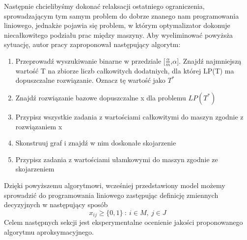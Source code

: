 \documentclass[12pt, a4paper]{report}
\begin{document}
  Następnie chcielibyśmy dokonać relaksacji ostatniego ograniczenia, sprowadzającym tym samym problem do dobrze znanego 
  nam programowania liniowego, jednakże pojawia się problem, w którym optymalizator dokonuje niecałkowitego podziału prac między maszyny. 
  Aby wyeliminować powyżsża sytuację, autor pracy \cite{Alg} zaproponował następujący algorytm:
  \begin{enumerate}
    \item Przeprowadź wyszukiwanie binarne w przedziale [$\frac{\alpha}{m}$,$\alpha$].
    Znajdź najmniejszą wartość T na zbiorze liczb całkowitych dodatniych, dla której 
    LP(T) ma dopuszczalne rozwiązanie. Oznacz tę wartość jako $T^{*}$
    \item Znajdź rozwiązanie bazowe dopuszczalne x dla problemu $LP(T^{*})$
    \item Przypisz wszystkie zadania z wartościami całkowitymi do maszyn zgodnie 
    z rozwiązaniem x
    \item Skonstruuj graf i znajdź w nim doskonałe skojarzenie
    \item Przypisz zadania z wartościami ułamkowymi do maszyn zgodnie ze skojarzeniem
  \end{enumerate}
  Dzięki powyższemu algorytmowi, wcześniej przedstawiony model możemy sprowadzić do programowania 
  liniowego zastępując definicję zmiennych decyzyjnych w następujący sposób
  \begin{equation}
    x_{ij} \geq \{0,1\} \: : \: i \in M, \: j \in J
  \end{equation}
  Celem następnych sekcji jest eksperymentalne ocenienie jakości proponowanego algorytmu aproksymacyjnego.
\end{document}
